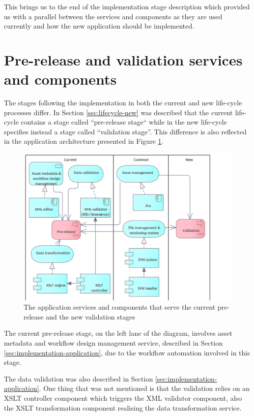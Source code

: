 	This brings us to the end of the implementation stage description which provided us with a parallel between the services and components as they are used currently and how the new application should be implemented. 
	
	\section{Pre-release and validation services and components}
	\label{sec:validation-application}
	
	The stages following the implementation in both the current and new life-cycle processes differ. In Section \ref{sec:lifecycle-new} was described that the current life-cycle contains a stage called ``pre-release stage`` while in the new life-cycle specifies instead a stage called ``validation stage''. This difference is also reflected in the application architecture presented in Figure \ref{fig:application-validation}.
	
	\begin{figure}[h]
		\centering
		\includegraphics[width=.9\textwidth]{images/application/Validation & Pre-release v3.png}
		\caption{The application services and components that serve the current pre-release and the new validation stages}
		\label{fig:application-validation}
	\end{figure}
	
	The current pre-release stage, on the left lane of the diagram, involves asset metadata and workflow design management service, described in Section \ref{sec:implementation-application}, due to the workflow automation involved in this stage. 
	
	The data validation was also described in Section \ref{sec:implementation-application}. One thing that was not mentioned is that the validation relies on an XSLT \citep{xslt3-Kay} controller component which triggers the XML validator component, also the XSLT transformation component realising the data transformation service.
	
